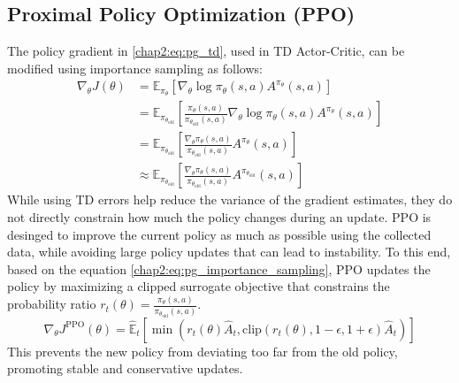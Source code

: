 \subsection{Proximal Policy Optimization (PPO)}
The policy gradient in \eqref{chap2:eq:pg_td}, used in TD Actor-Critic, can be modified using importance sampling as follows:
\begin{equation} \label{chap2:eq:pg_importance_sampling}
  \begin{aligned}
    \nabla_\theta J(\theta) 
    &= \mathbb{E}_{\pi_\theta} \left[ \nabla_\theta \log \pi_\theta(s, a) A^{\pi_\theta}(s, a) \right] \\
    &= \mathbb{E}_{\pi_{\theta_\text{old}}} \left[ \frac{\pi_\theta(s, a)}{\pi_{\theta_\text{old}}(s, a)} \nabla_\theta \log \pi_\theta(s, a) A^{\pi_\theta}(s, a) \right] \\
    &= \mathbb{E}_{\pi_{\theta_\text{old}}} \left[ \frac{\nabla_\theta \pi_\theta(s, a)}{\pi_{\theta_\text{old}}(s, a)} A^{\pi_\theta}(s, a) \right] \\
    &\approx \mathbb{E}_{\pi_{\theta_\text{old}}} \left[ \frac{\nabla_\theta \pi_\theta(s, a)}{\pi_{\theta_\text{old}}(s, a)} A^{\pi_{\theta_\text{old}}}(s, a) \right]
  \end{aligned}
\end{equation}
While using TD errors help reduce the variance of the gradient estimates, they do not directly constrain how much the policy changes during an update.
PPO is desinged to improve the current policy as much as possible using the collected data, while avoiding large policy updates that can lead to instability.
To this end, based on the equation \eqref{chap2:eq:pg_importance_sampling}, PPO updates the policy by maximizing a clipped surrogate objective that constrains the probability ratio $r_t(\theta) = \frac{\pi_\theta(s, a)}{\pi_{\theta_\text{old}}(s, a)}$.
\begin{equation}
  \nabla_\theta J^{\text{PPO}}(\theta) = \hat{\mathbb{E}}_t \left[ \min \left( r_t(\theta) \hat{A}_t, \text{clip}(r_t(\theta), 1 - \epsilon, 1 + \epsilon)\hat{A}_t \right)  \right]
\end{equation}
This prevents the new policy from deviating too far from the old policy, promoting stable and conservative updates.

